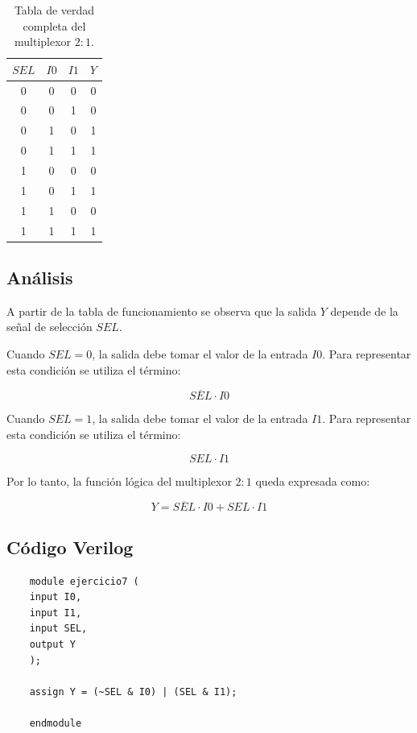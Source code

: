 \documentclass[a4paper,12pt]{article}
\begin{document}
\begin{table}[h]
	\centering
	\begin{tabular}{|c|c|c|c|}
		\hline
		$SEL$ & $I0$ & $I1$ & $Y$ \\ \hline
		0 & 0 & 0 & 0 \\ \hline
		0 & 0 & 1 & 0 \\ \hline
		0 & 1 & 0 & 1 \\ \hline
		0 & 1 & 1 & 1 \\ \hline
		1 & 0 & 0 & 0 \\ \hline
		1 & 0 & 1 & 1 \\ \hline
		1 & 1 & 0 & 0 \\ \hline
		1 & 1 & 1 & 1 \\ \hline
	\end{tabular}
	\caption{Tabla de verdad completa del multiplexor $2:1$.}
	\label{tab:ej7_mux21}
\end{table}

\subsection{Análisis}

A partir de la tabla de funcionamiento se observa que la salida $Y$ depende de la señal de selección $SEL$.

Cuando $SEL = 0$, la salida debe tomar el valor de la entrada $I0$. Para representar esta condición se utiliza el término:

\[
\overline{SEL} \cdot I0
\]

Cuando $SEL = 1$, la salida debe tomar el valor de la entrada $I1$. Para representar esta condición se utiliza el término:

\[
SEL \cdot I1
\]

Por lo tanto, la función lógica del multiplexor $2:1$ queda expresada como:

\[
Y = \overline{SEL} \cdot I0 + SEL \cdot I1
\]

\subsection{Código Verilog}

\begin{verbatim}
	module ejercicio7 (
	input I0,
	input I1,
	input SEL,
	output Y
	);
	
	assign Y = (~SEL & I0) | (SEL & I1);
	
	endmodule
\end{verbatim}
\end{document}
